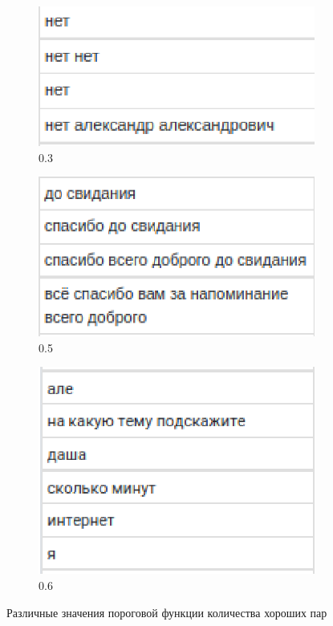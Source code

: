 \documentclass[times,specification,annotation]{itmo-student-thesis}
\begin{document}
	 \begin{figure}[H]
		\begin{subfigure}[c]{0.3\textwidth}
			\includegraphics[width=\textwidth]{Sample_0.3.eps}
			\caption{0.3}
		\end{subfigure}
		\begin{subfigure}[c]{0.3\textwidth}
			\includegraphics[width=\textwidth]{Sample_0.5.eps}
			\caption{0.5}
		\end{subfigure}
		\begin{subfigure}[c]{0.3\textwidth}
			\includegraphics[width=\textwidth]{Sample_0.6.eps}
			\caption{0.6}
		\end{subfigure}
		\caption{Различные значения пороговой функции количества хороших пар}
		\label{fig:claster:trashholds}
	\end{figure}
\end{document}
